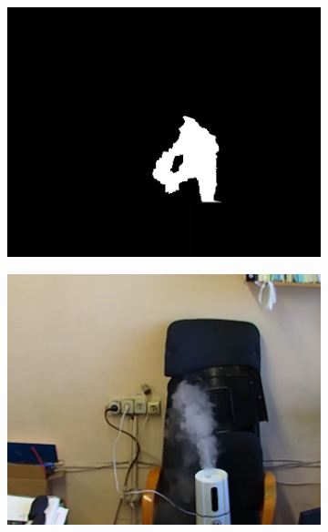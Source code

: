 \documentclass[t]{beamer}
\begin{document}
\begin{frame}
\begin{figure}[h!]
\begin{subfigure}{.30\textwidth}
			\end{subfigure}
			\begin{subfigure}{.30\textwidth}
				\centering
				\includegraphics[width = \textwidth]{image/examples/mask/206}
			\end{subfigure}
			\hspace*{0.00cm}
			\begin{subfigure}{.30\textwidth}
				\centering
				\includegraphics[width = \textwidth]{image/examples/img/240}
				\caption{}
			\end{subfigure}

\end{figure}
\end{frame}
\end{document}
